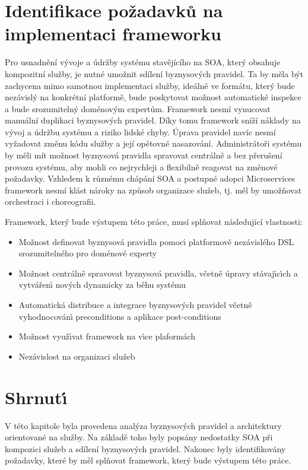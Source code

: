 \section{Identifikace požadavků na implementaci frameworku}\label{sec:implementation-requirements}

Pro usnadnění vývoje a údržby systému stavějícího na \gls{SOA}, který
obsahuje kompozitní služby, je nutné umožnit sdílení byznysových pravidel.
Ta by měla být zachycena mimo samotnou implementaci služby, ideálně ve formátu,
který bude nezávislý na konkrétní platformě, bude poskytovat možnost automatické
inspekce a bude srozumitelný doménovým expertům. Framework nesmí vynucovat
manuální duplikaci byznysových pravidel. Díky tomu framework sníží náklady
na vývoj a údržbu systému a riziko lidské chyby. Úprava pravidel navíc nesmí
vyžadovat změnu kódu služby a její opětovné nasazování.
Administrátoři systému by měli mít možnost byznysová pravidla spravovat centrálně a bez
přerušení provozu systému, aby mohli co nejrychleji a flexibilně reagovat na změnové požadavky.
Vzhledem k různému chápání \gls{SOA} a postupné adopci Microservices framework nesmí klást
nároky na způsob organizace služeb, tj. měl by umožňovat orchestraci i choreografii.

Framework, který bude výstupem této práce, musí splňovat následující vlastnosti:

\begin{itemize}
    \item{Možnost definovat byznysová pravidla pomoc\'{\i} platformově nezávislého \gls{DSL} srozumitelného pro doménové experty}
    \item{Možnost centrálně spravovat byznysová pravidla, včetně úpravy stávaj\'{\i}c\'{\i}ch a vytvářen\'{\i} nov\'ych dynamicky za běhu systému}
    \item{Automatická distribuce a integrace byznysových pravidel včetně vyhodnocován\'{\i} preconditions a aplikace post-conditions}
    \item{Možnost využ\'{\i}vat framework na v\'{\i}ce plaformách}
    \item{Nezávislost na organizaci služeb}
\end{itemize}

\section{Shrnut\'{\i}}

V této kapitole byla provedena analýza byznysov\'ych pravidel a architektury orientované na služby.
Na základě toho byly popsány nedostatky \gls{SOA} při kompozici služeb a sdílení byznysových pravidel.
Nakonec byly identifikovány požadavky, které by měl splňovat framework, který bude v\'ystupem této práce.
